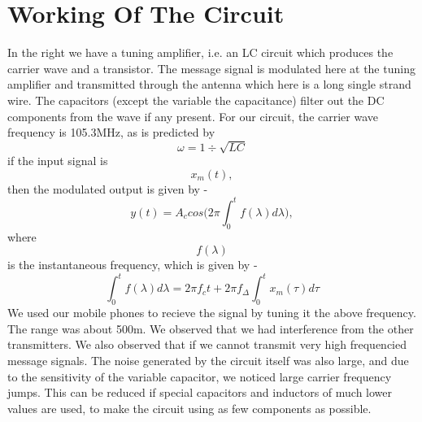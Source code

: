 \documentclass[journal,10pt,twocolumn]{IEEEtran}
\begin{document}
\section*{Working Of The Circuit}
In the right we have a tuning amplifier, i.e. an LC circuit which produces the carrier wave and a transistor. 
The message signal is modulated here at the tuning amplifier and transmitted through the antenna which here is a long single strand wire.
The capacitors (except the variable the capacitance) filter out the DC components from the wave if any present.
For our circuit, the carrier wave frequency is 105.3MHz, as is predicted by
\begin{equation}
\omega = 1 \div  \sqrt{LC}
\end{equation}
if the input signal is \begin{equation*} x_{m}(t), \end{equation*} then the modulated output is given by -
\begin{equation}
y(t) = A_{c} cos \big(2\pi  \int_0^t  f( \lambda ) d\lambda\big),
\end{equation}
where \begin{equation*}f(\lambda)\end{equation*} is the instantaneous frequency, which is given by - 
\begin{equation}
\int_0^t f(\lambda) d\lambda = 2\pi f_{c}t + 2\pi f_{\Delta} \int_0^t x_{m}(\tau) d\tau 
\end{equation}
We used our mobile phones to recieve the signal by tuning it the above frequency.
The range was about 500m. We observed that we had interference from the other transmitters. We also observed that if we cannot transmit very high frequencied message signals. The noise generated by the circuit itself was also large, and due to the sensitivity of the variable capacitor, we noticed large carrier frequency jumps. This can be reduced if special capacitors and inductors of much lower values are used, to make the circuit using as few components as possible.
\end{document}
